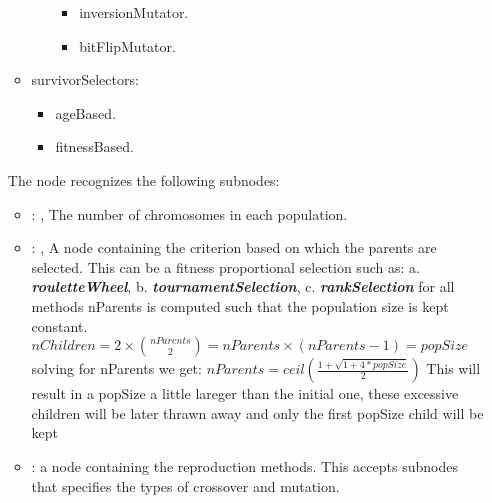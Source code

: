 \begin{itemize}
\begin{itemize}
\begin{itemize}
\begin{itemize}
      \item inversionMutator.
      \item bitFlipMutator.
      \end{itemize}                                                                    \end{itemize}
      \item survivorSelectors:
      \begin{itemize}                                                                        \item
      ageBased.                                                                        \item
      fitnessBased.
      \end{itemize}                                                \end{itemize}

      The  node recognizes the following subnodes:
      \begin{itemize}
        \item {}: , 
          The number of chromosomes in each population.

        \item {}: , 
          A node containing the criterion based on which the parents are selected. This can be a
          fitness proportional selection such as:                   a.
          \textbf{\textit{rouletteWheel}},                   b.
          \textbf{\textit{tournamentSelection}},                   c.
          \textbf{\textit{rankSelection}}                   for all methods nParents is computed
          such that the population size is kept constant.                   $nChildren = 2 \times
          {nParents \choose 2} = nParents \times (nParents-1) = popSize$                   solving
          for nParents we get:                   $nParents = ceil(\frac{1 + \sqrt{1+4*popSize}}{2})$
          This will result in a popSize a little lareger than the initial one, these excessive
          children will be later thrawn away and only the first popSize child will be kept

        \item {}:
          a node containing the reproduction methods.                   This accepts subnodes that
          specifies the types of crossover and mutation.


\end{itemize}
\end{itemize}
